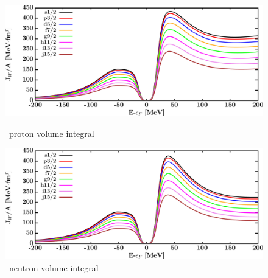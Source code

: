 \begin{figure}[hbtp]
    \centering
    \begin{minipage}{0.42\textwidth}
        \centering
        \includegraphics[width=\textwidth]{figures/ca48_protonVolumeIntegrals.png}
        \caption*{\caEight\ proton volume integral}
        \label{DOMFitData_ca48_proton_potentialIntegral}
    \end{minipage}\hspace{6pt}
    \begin{minipage}{0.42\textwidth}
        \centering
        \includegraphics[width=\textwidth]{figures/ca48_neutronVolumeIntegrals.png}
        \caption*{\caEight\ neutron volume integral}
        \label{DOMFitData_ca48_neutron_potentialIntegral}
    \end{minipage}
\end{figure}
